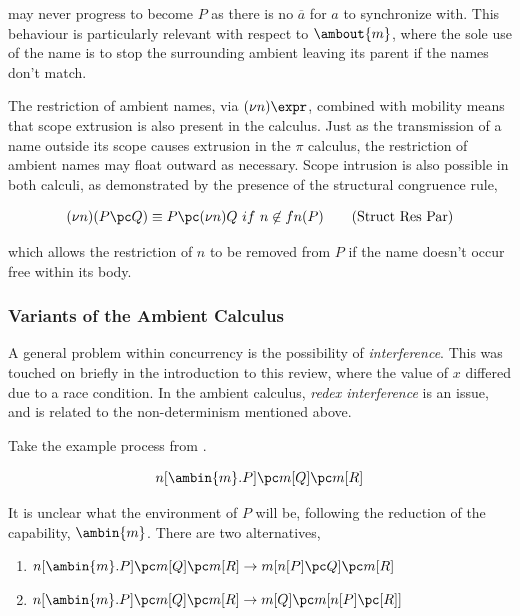 \noindent may never progress to become $P$ as there is no $\overline{a}$
for $a$ to synchronize with.  This behaviour is particularly relevant
with respect to $\ambout{m}$, where the sole use of the name is to stop
the surrounding ambient leaving its parent if the names don't match.

The restriction of ambient names, via $(\nu n) \expr$, combined with
mobility means that scope extrusion is also present in the calculus.
Just as the transmission of a name outside its scope causes extrusion
in the $\pi$ calculus, the restriction of ambient names may float
outward as necessary.  Scope intrusion is also possible in both
calculi, as demonstrated by the presence of the structural congruence
rule,

\begin{equation}
(\nu n)(P \pc Q) \equiv P \pc (\nu n) Q\ if\ n \not \in fn(P) \tag{Struct Res Par}
\end{equation}

\noindent which allows the restriction of $n$ to be removed from $P$
if the name doesn't occur free within its body.

\subsubsection{Variants of the Ambient Calculus}
\label{ambvariants}

A general problem within concurrency is the possibility of
\emph{interference}.  This was touched on briefly in the introduction
to this review, where the value of $x$ differed due to a race
condition.  In the ambient calculus, \emph{redex interference}
\cite{sangiorgi:mobsafeambients} is an issue, and is related to the
non-determinism mentioned above.

Take the example process from \cite{sangiorgi:mobsafeambients}.

\begin{equation}
n[\ambin{m}.P] \pc m[Q] \pc m[R]
\end{equation}

\noindent It is unclear what the environment of $P$ will be, following
the reduction of the capability, $\ambin{m}$.  There are two
alternatives,

\begin{enumerate}
\item $n[\ambin{m}.P] \pc m[Q] \pc m[R] \rightarrow m[n[P] \pc Q] \pc m[R]$
\item $n[\ambin{m}.P] \pc m[Q] \pc m[R] \rightarrow m[Q] \pc m[n[P] \pc [R]]$
\end{enumerate}


